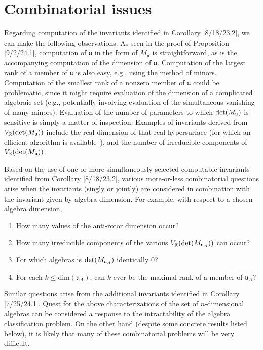 \documentclass{amsart}
\numberwithin{equation}{section}
\theoremstyle{definition}
\numberwithin{theorem}{section}
\begin{document}
\section{Combinatorial issues}
Regarding computation of the invariants identified in Corollary \ref{8/18/23.2}, we can make the following observations.  As seen in the proof of Proposition \ref{9/2/24.1}, computation of $\mathfrak{u}$ in the form of $M_\mathfrak{u}$ is straightforward, as is the accompanying computation of the dimension of $\mathfrak{u}$.   Computation of the largest rank of a member of $\mathfrak{u}$ is also easy, e.g., using the method of minors.  Computation of the smallest rank of a nonzero member of $\mathfrak{u}$ could be problematic, since it might require evaluation of the dimension of a complicated algebraic set (e.g., potentially involving evaluation of the simultaneous vanishing of many minors).  Evaluation of the number of parameters to which ${\rm det}(M_{\mathfrak{u}})$ is sensitive is simply a matter of inspection.  Examples of invariants derived from $V_\mathbb{R}({\rm det}(M_{\mathfrak{u}}))$ include the real dimension of that real hypersurface (for which an efficient algorithm is \mbox{available \cite{bannwarth:2015})}, and the number of irreducible components of $V_\mathbb{R}({\rm det}(M_{\mathfrak{u}}))$.  

 
Based on the use of one or more simultaneously selected computable invariants identified from Corollary \ref{8/18/23.2}, various more-or-less combinatorial questions arise when the invariants (singly or jointly) are considered in combination with the invariant given by algebra dimension.  For example, with respect to a chosen algebra dimension,  

\begin{enumerate} \item How many values of the anti-rotor dimension occur?  \item How many irreducible components of the various $V_\mathbb{R}({\rm det}(M_{\mathfrak{u}_A}))$ can occur?  \item For which algebras is ${\rm det}(M_{\mathfrak{u}_A})$ identically $0$?  \item For each $k\le \text{dim}(\mathfrak{u}_A)$, can $k$ ever be the maximal rank of a member of $\mathfrak{u}_A$?   \end{enumerate}  
Similar questions arise from the additional invariants identified in Corollary \ref{7/25/24.1}.  Quest for the above characterizations of the set of $n$-dimensional algebras can be considered a response to the intractability of the algebra classification problem.  On the other hand (despite some concrete results listed below), it is likely that many of these combinatorial problems will be very difficult.
\end{document}
